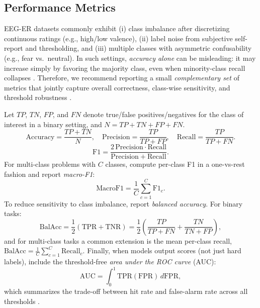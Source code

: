 \documentclass{WileyMSP-template}
\begin{document}
\subsection{Performance Metrics}
\label{subsec:performance_metrics}
EEG-ER datasets commonly exhibit (i) class imbalance after discretizing continuous ratings (e.g., high/low valence), (ii) label noise from subjective self-report and thresholding, and (iii) multiple classes with asymmetric confusability (e.g., fear vs.\ neutral). In such settings, \emph{accuracy alone} can be misleading: it may increase simply by favoring the majority class, even when minority-class recall collapses \cite{li2022tutorial,PeerJCS2065}. Therefore, we recommend reporting a small \emph{complementary set} of metrics that jointly capture overall correctness, class-wise sensitivity, and threshold robustness \cite{kukhilava2025evaluation}.

Let $TP$, $TN$, $FP$, and $FN$ denote true/false positives/negatives for the class of interest in a binary setting, and $N=TP+TN+FP+FN$.
\begin{equation}
\mathrm{Accuracy}=\frac{TP+TN}{N}, \quad
\mathrm{Precision}=\frac{TP}{TP+FP}, \quad
\mathrm{Recall}=\frac{TP}{TP+FN}.
\label{eq:basic_metrics}
\end{equation}
\begin{equation}
\mathrm{F1}=\frac{2\,\mathrm{Precision}\cdot \mathrm{Recall}}{\mathrm{Precision}+\mathrm{Recall}}.
\label{eq:f1}
\end{equation}
For multi-class problems with $C$ classes, compute per-class F1 in a one-vs-rest fashion and report \emph{macro-F1}:
\begin{equation}
\mathrm{MacroF1}=\frac{1}{C}\sum_{c=1}^{C}\mathrm{F1}_c.
\label{eq:macro_f1}
\end{equation}
To reduce sensitivity to class imbalance, report \emph{balanced accuracy}. For binary tasks:
\begin{equation}
\mathrm{BalAcc}=\frac{1}{2}\left(\mathrm{TPR}+\mathrm{TNR}\right)
=\frac{1}{2}\left(\frac{TP}{TP+FN}+\frac{TN}{TN+FP}\right),
\label{eq:balacc}
\end{equation}
and for multi-class tasks a common extension is the mean per-class recall,
$\mathrm{BalAcc}=\frac{1}{C}\sum_{c=1}^{C}\mathrm{Recall}_c$.
Finally, when models output scores (not just hard labels), include the threshold-free \emph{area under the ROC curve} (AUC):
\begin{equation}
\mathrm{AUC}=\int_{0}^{1}\mathrm{TPR}(\mathrm{FPR})\, d\mathrm{FPR},
\label{eq:auc}
\end{equation}
which summarizes the trade-off between hit rate and false-alarm rate across all thresholds \cite{Fawcett2006ROC}.
\end{document}
